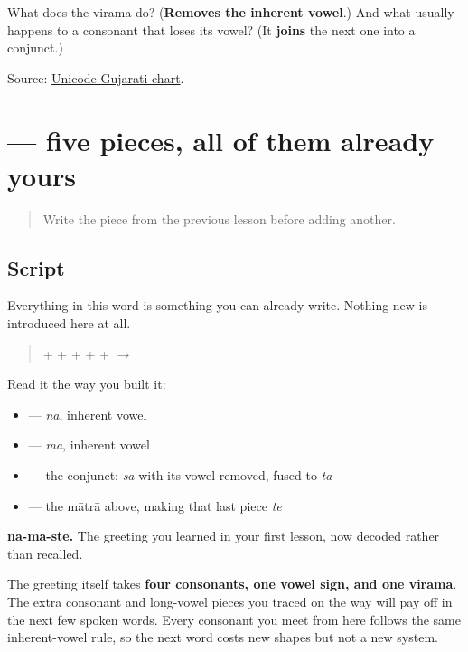 \begin{tcolorbox}[breakable,colback=teal!4,colframe=teal!35!black,title={Before you move on}]
What does the virama do? (\textbf{Removes the inherent vowel}.) And what usually happens to a consonant that loses its vowel? (It \textbf{joins} the next one into a conjunct.)

Source: \href{https://www.unicode.org/charts/PDF/U0A80.pdf}{Unicode Gujarati chart}.
\end{tcolorbox}
\section[namaste]{ — five pieces, all of them already yours}

\label{lesson:GU-W01-namaste-read}



\begin{quote}
Write the piece from the previous lesson before adding another.
\end{quote}

\subsection*{Script}
Everything in this word is something you can already write. Nothing new is introduced here at all.

\begin{quote}
\textbf{} + \textbf{} + \textbf{} + \textbf{} + \textbf{} + \textbf{} $\to$ \textbf{}
\end{quote}

Read it the way you built it:

\begin{itemize}
\raggedright
  \item \textbf{} — \emph{na}, inherent vowel
  \item \textbf{} — \emph{ma}, inherent vowel
  \item \textbf{} — the conjunct: \emph{sa} with its vowel removed, fused to \emph{ta}
  \item \textbf{} — the mātrā above, making that last piece \emph{te}
\end{itemize}

\textbf{na-ma-ste.} The greeting you learned in your first lesson, now decoded rather than recalled.

The greeting itself takes \textbf{four consonants, one vowel sign, and one virama}. The extra consonant and long-vowel pieces you traced on the way will pay off in the next few spoken words. Every consonant you meet from here follows the same inherent-vowel rule, so the next word costs new shapes but not a new system.

